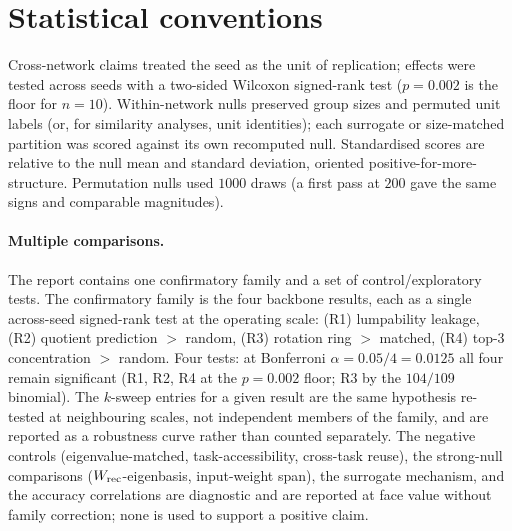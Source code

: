 \documentclass[11pt]{article}
\begin{document}
\section{Statistical conventions}
\label{sec:statconv}
Cross-network claims treated the seed as the unit of replication; effects were tested across
seeds with a two-sided Wilcoxon signed-rank test ($p=0.002$ is the floor for $n=10$).
Within-network nulls preserved group sizes and permuted unit labels (or, for similarity
analyses, unit identities); each surrogate or size-matched partition was scored against its own
recomputed null. Standardised scores are relative to the null mean and standard deviation,
oriented positive-for-more-structure. Permutation nulls used $1000$ draws (a first pass at $200$
gave the same signs and comparable magnitudes).

\paragraph{Multiple comparisons.} The report contains one confirmatory family and a set of
control/exploratory tests. The confirmatory family is the four backbone results, each as a single
across-seed signed-rank test at the operating scale: (R1) lumpability leakage, (R2) quotient
prediction $>$ random, (R3) rotation ring $>$ matched, (R4) top-3 concentration $>$ random. Four
tests: at Bonferroni $\alpha=0.05/4=0.0125$ all four remain significant (R1, R2, R4 at the
$p=0.002$ floor; R3 by the $104/109$ binomial). The $k$-sweep entries for a given result are the
same hypothesis re-tested at neighbouring scales, not independent members of the family, and are
reported as a robustness curve rather than counted separately. The negative controls
(eigenvalue-matched, task-accessibility, cross-task reuse), the strong-null comparisons
($W_{\rm rec}$-eigenbasis, input-weight span), the surrogate mechanism, and the accuracy
correlations are diagnostic and are reported at face value without family correction; none is
used to support a positive claim.
\end{document}
